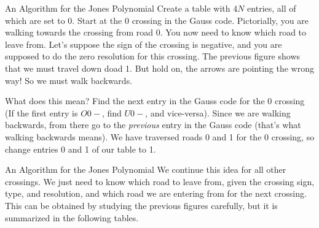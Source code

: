 \documentclass{beamer}
\begin{document}
    \begin{frame}{An Algorithm for the Jones Polynomial}
        Create a table with $4N$ entries, all of which are set to 0.
        Start at the 0 crossing in the Gauss code. Pictorially, you are walking
        towards the crossing from road 0. You now need to know which road to
        leave from. Let's suppose the sign of the crossing is negative, and
        you are supposed to do the zero resolution for this crossing. The
        previous figure shows that we must travel down doad 1. But hold on,
        the arrows are pointing the wrong way! So we must walk backwards.
        \par\hfill\par
        What does this mean? Find the next entry in the Gauss code for the 0
        crossing (If the first entry is $O0-$, find $U0-$, and vice-versa).
        Since we are walking backwards, from there go to the \textit{previous}
        entry in the Gauss code (that's what walking backwards means). We have
        traversed roads 0 and 1 for the 0 crossing, so change entries 0 and 1 of
        our table to 1.
    \end{frame}
    \begin{frame}{An Algorithm for the Jones Polynomial}
        We continue this idea for all other crossings. We just need to know
        which road to leave from, given the crossing sign, type, and resolution,
        and which road we are entering from for the next crossing. This can be
        obtained by studying the previous figures carefully, but it is
        summarized in the following tables.
    \end{frame}
\end{document}
